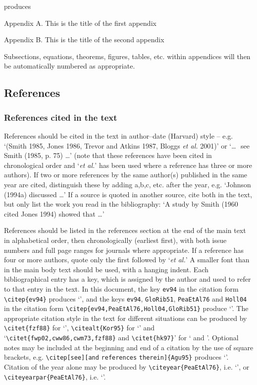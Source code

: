 \documentclass[]{cJEN2e}
\begin{document}
\noindent produces\medskip

\noindent Appendix A. This is the title of the first appendix

\noindent Appendix B. This is the title of the second appendix

\medskip
Subsections, equations, theorems, figures, tables, etc. within
appendices will then be automatically numbered as appropriate.


\subsection{References}\label{refs}

\subsubsection{References cited in the text} References should be cited in the text in  author--date (Harvard) style -- e.g. `(Smith 1985, Jones 1986, Trevor and Atkins 1987, Bloggs {\itshape{et al.}} 2001)' or `\ldots\,\, see Smith (1985, p. 75) \ldots' (note that these references have been cited in chronological order and `{\itshape{et al.}}' has been used where a reference has three or more authors). If two or more references by the same author(s) published in the same year are cited, distinguish these by adding a,b,c, etc. after the year, e.g. `Johnson (1994a) discussed \ldots' If a source is quoted in another source, cite both in the text, but only list the work you read in the bibliography: `A study by Smith (1960 cited Jones 1994) showed that \ldots'

References should be listed in the references section at the end of the main text in alphabetical order, then chronologically (earliest first), with both issue numbers and full page ranges for journals where appropriate. If a reference has four or more authors, quote only the first followed  by `{\itshape{et al.}}' A smaller font than in the main body text should be used, with a hanging indent. Each bibliographical entry has a key, which is assigned by the author and used to refer to that entry in the text. In this document, the key \verb"ev94" in the citation form \verb"\citep{ev94}" produces `\citep{ev94}', and the keys \verb"ev94", \verb"GloRib51", \verb"PeaEtAl76" and \verb"Holl04" in the citation form \verb"\citep{ev94,PeaEtAl76,Holl04,GloRib51}" produce `\citep{ev94,PeaEtAl76,Holl04,GloRib51}'. The appropriate citation style in the text for different situations can be produced by \verb"\citet{fzf88}" for `\citet{fzf88}', \verb"\citealt{Kor95}" for `\citealt{Kor95}' and `\verb"\citet{fwp02,cww86,cwm73,fzf88}" and \verb"\citet{hk97}"' for `\citet{fwp02,cww86,cwm73,fzf88} and \citet{hk97}'. Optional notes may be included at the beginning and end of a citation by the use of square brackets, e.g. \verb"\citep[see][and" \verb"references" \verb"therein]{Agu95}" produces `\citep[see][and references therein]{Agu95}'. Citation of the year alone may be produced by \verb"\citeyear{PeaEtAl76}", i.e. `\citeyear{PeaEtAl76}', or \verb"\citeyearpar{PeaEtAl76}", i.e. `\citeyearpar{PeaEtAl76}'.
\end{document}
